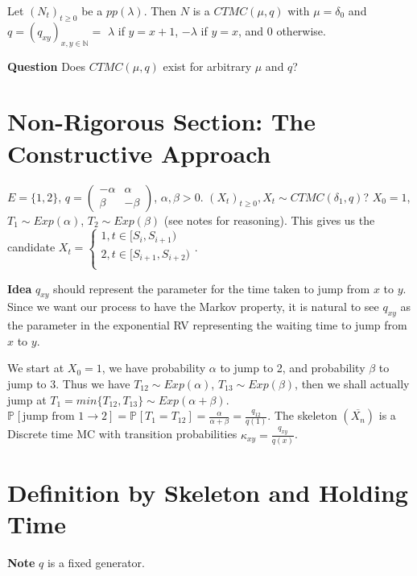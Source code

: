 \begin{ex}
	Let $(N_t)_{t\geq 0}$ be a $pp(\lambda)$. Then  $N$ is a $CTMC(\mu, q)$ with  $\mu = \delta_0$ and $q=(q_{xy})_{x,y \in \mathbb{N}}=$ $\lambda$ if $y=x+1$,  $-\lambda$ if  $y=x$, and  $0$ otherwise.
\end{ex}

\textbf{Question} Does $CTMC(\mu, q)$ exist for arbitrary $\mu $ and $q$?

\section{Non-Rigorous Section: The Constructive Approach}
\begin{ex}
	$E=\{1,2\}$,  $q=
	\begin{pmatrix}
		-\alpha & \alpha \\
		\beta & -\beta
	\end{pmatrix}$, $\alpha, \beta > 0$.
	$(X_t)_{t\geq 0}, X_t \sim CTMC(\delta_1, q)$?
	$X_0 =1$, $T_1 \sim Exp(\alpha)$, $T_2 \sim Exp(\beta)$ (see notes for reasoning). This gives us the candidate $X_t = 
\begin{cases}
1, t \in [S_i, S_{i+1}) \\
2, t \in [S_{i+1}, S_{i+2}) \\
\end{cases}
$.
\end{ex}

\textbf{Idea} $q_{xy}$ should represent the parameter for the time taken to jump from $x$ to $y$. Since we want our process to have the Markov property, it is natural to see $q_{xy}$ as the parameter in the exponential RV representing the waiting time to jump from $x$ to $y$.

\begin{ex}
	We start at $X_0 =1$, we have probability  $\alpha $ to jump to 2, and probability $\beta $ to jump to 3. Thus we have $T_{12} \sim Exp(\alpha)$, $T_{13} \sim Exp(\beta )$, then we shall actually jump at $T_1 = min\{T_{12}, T_{13}\} \sim Exp(\alpha + \beta )$. $\mathbb{P}_{} \left[ \textrm{jump from } 1 \to 2 \right] = \mathbb{P}_{} \left[ T_1 = T_{12} \right]= \frac{\alpha }{\alpha + \beta } = \frac{q_{12}}{q(1)} $. The skeleton $(\overline{X_n})$ is a Discrete time MC with transition probabilities $\kappa_{xy}= \frac{q_{xy}}{q(x)}$. 
\end{ex}

\section{Definition by Skeleton and Holding Time}
\textbf{Note} $q$ is a fixed generator.
